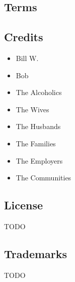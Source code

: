 \onecolumn
\subsection*{Terms}

\subsection*{Credits}

\begingroup
\fontsize{12pt}{11pt}
\selectfont

\begin{multicols}{3}
\begin{headings}
\vspace{-\topsep}

\begin{itemize}[rightmargin=0.125in, leftmargin=0.125in]

\fontsize{9.5pt}{11pt}
\selectfont
\setlength{\parskip}{0pt}
\setlength{\itemsep}{0pt plus 1pt}
\setlength{\columnsep}{0.1em}
    

\item Bill W.
\item Bob
\item The Alcoholics
\item The Wives
\item The Husbands
\item The Families
\item The Employers
\item The Communities
\vfill


\end{itemize}
\vspace{-\topsep}
\end{headings}
\end{multicols}

\subsection*{License}


TODO


\subsection*{Trademarks}

TODO

\vfill
{}

\endgroup

\clearpage
\twocolumn
\justify
\thispagestyle{empty}
\mbox{}
